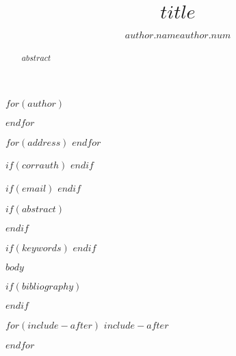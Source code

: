 \documentclass[$if(documentclass)$$documentclass$$else$article$endif$$if(classoption)$,$classoption$$endif$]{JASA-El}
\begin{document}
\title[$runningtitle$]{$title$}

$for(author)$
 \author{$author.name$$author.num$}
$endfor$

$for(address)$
$endfor$

$if(corrauth)$
$endif$

$if(email)$
$endif$

$if(abstract)$
 \begin{abstract}
$abstract$
 \end{abstract}
$endif$

$if(keywords)$
$endif$



\maketitle

$body$

$if(bibliography)$


$endif$

$for(include-after)$
$include-after$

$endfor$
\end{document}
